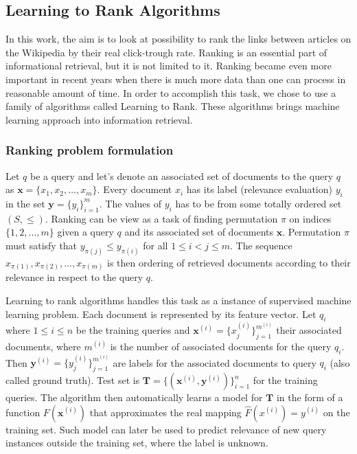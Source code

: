 \subsection{Learning to Rank Algorithms}

In this work, the aim is to look at possibility to rank the links between articles on the Wikipedia by their real click-trough rate. Ranking is an essential part of informational retrieval, but it is not limited to it. Ranking became even more important in recent years when there is much more data than one can process in reasonable amount of time. In order to accomplish this task, we chose to use a family of algorithms called Learning to Rank. These algorithms brings machine learning approach into information retrieval.

\subsubsection{Ranking problem formulation}
Let $q$ be a query and let's denote an associated set of documents to the query $q$ as $\mathbf{x} = \{x_1, x_2, \ldots, x_m\}$. Every document $x_i$ has its label (relevance evaluation) $y_i$ in the set $\mathbf{y} = \{y_i\}^m_{i=1}$. The values of $y_i$ has to be from some totally ordered set $(S, \le)$.  Ranking can be view as a task of finding permutation $\pi$ on indices $\{1,2,\ldots, m\}$ given a query $q$ and its associated set of documents $\mathbf{x}$. Permutation $\pi$ must satisfy that $y_{\pi(j)} \le y_{\pi(i)}$ for all $1\le i < j \le m$. The sequence $x_{\pi(1)},x_{\pi(2)}, \ldots, x_{\pi(m)}$ is then ordering of retrieved documents according to their relevance in respect to the query $q$.

Learning to rank algorithms handles this task as a instance of supervised machine learning problem. Each document is represented by its feature vector. Let $q_i$ where $1 \le i \le n$ be the training queries and $\mathbf{x}^{(i)} = \{x_{j}^{(i)}\}_{j = 1}^{m^{(i)}}$ their associated documents, where $m^{(i)}$ is the number of associated documents for the query $q_i$. Then $\mathbf{y}^{(i)} = \{y_{j}^{(i)}\}_{j = 1}^{m^{(i)}}$ are labels for the associated documents to query $q_i$ (also called ground truth). Test set is $\mathbf{T} = \{(\mathbf{x}^{(i)},\mathbf{y}^{(i)} )\}_{i = 1}^{n}$ for the training queries. The algorithm then automatically learns a model for $\mathbf{T}$ in the form of a function $F(\mathbf{x}^{(i)})$ that approximates the real mapping $\hat{F}(x^{(i)}) = y^{(i)}$ on the training set. Such model can later be used to predict relevance of new query instances outside the training set, where the label is unknown.


